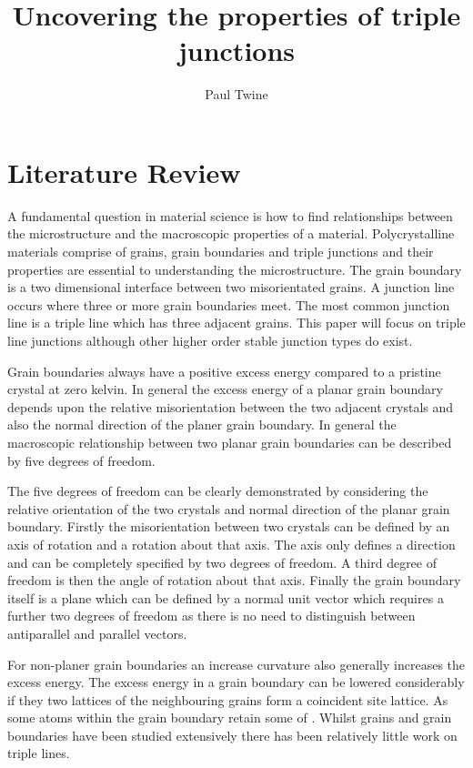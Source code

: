 \documentclass[12pt,a4paper]{book}
\title{Uncovering the properties of triple junctions}
\author{Paul Twine}
\begin{document}
\maketitle

\chapter{Literature Review}

A fundamental question in material science is how to find relationships between the microstructure and the macroscopic properties of a material. Polycrystalline materials comprise of grains, grain boundaries and triple junctions and their properties are essential to understanding the microstructure. The grain boundary is a two dimensional interface between two misorientated grains. A junction line occurs where three or more grain boundaries meet. The most common junction line is a triple line which has three adjacent grains. This paper will focus on triple line junctions although other higher order stable junction types do exist.

Grain boundaries always have a positive excess energy compared to a pristine crystal at zero kelvin. In general the excess energy of a planar grain boundary depends upon the relative misorientation between the two adjacent crystals and also the normal direction of the planer grain boundary. In general the macroscopic relationship between two planar grain boundaries can be described by five degrees of freedom. 

The five degrees of freedom can be clearly demonstrated by considering the relative orientation of the two crystals and normal direction of the planar grain boundary. Firstly the misorientation between two crystals can be defined by an axis of rotation and a rotation about that axis.  The axis only defines a direction and can be completely specified by two degrees of freedom. A third degree of freedom is then the angle of rotation about that axis. Finally the grain boundary itself is a plane which can be defined by a normal unit vector which requires a further two degrees of freedom as there is no need to distinguish between antiparallel and parallel vectors.


For non-planer grain boundaries an increase curvature also generally increases the excess energy.  The excess energy in a grain boundary can be lowered considerably if they two lattices of the neighbouring grains form a coincident site lattice. As some atoms within the grain boundary retain some of . Whilst grains and grain boundaries have been studied extensively there has been relatively little work on triple lines.
\end{document}
